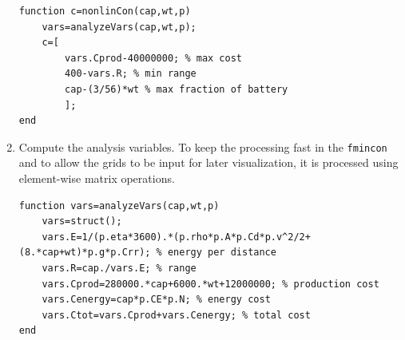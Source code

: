 \documentclass[11pt,twocolumn]{article}
\begin{document}
\begin{enumerate}
\begin{lstlisting}[firstnumber=last]
%% def nonlinear constraints
function c=nonlinCon(cap,wt,p)
    vars=analyzeVars(cap,wt,p);
    c=[
        vars.Cprod-40000000; % max cost
        400-vars.R; % min range
        cap-(3/56)*wt % max fraction of battery
        ];
end
                    \end{lstlisting}
                    \item Compute the analysis variables. To keep the processing fast in the \texttt{fmincon} and to allow the grids to be input for later visualization, it is processed using element-wise matrix operations.
                    \begin{lstlisting}[firstnumber=last]
%% def analysis variables
function vars=analyzeVars(cap,wt,p)
    vars=struct();
    vars.E=1/(p.eta*3600).*(p.rho*p.A*p.Cd*p.v^2/2+(8.*cap+wt)*p.g*p.Crr); % energy per distance
    vars.R=cap./vars.E; % range
    vars.Cprod=280000.*cap+6000.*wt+12000000; % production cost
    vars.Cenergy=cap*p.CE*p.N; % energy cost
    vars.Ctot=vars.Cprod+vars.Cenergy; % total cost
end
                    \end{lstlisting}
                \end{enumerate}
\end{document}

